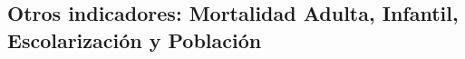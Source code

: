     
\subsection{Otros indicadores: Mortalidad Adulta, Infantil, Escolarización y Población}








